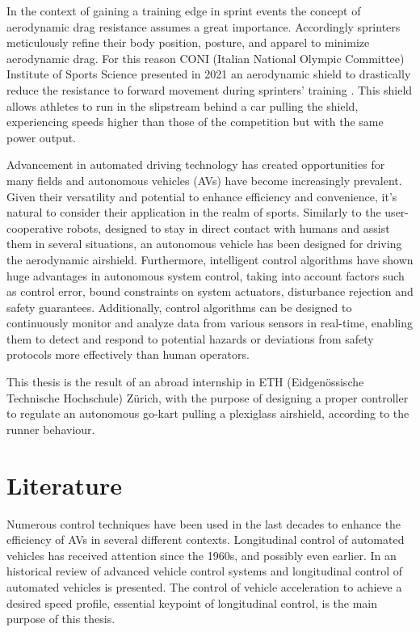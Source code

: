 \documentclass[a4paper,12pt,oneside]{book}
\begin{document}
In the context of gaining a training edge in sprint events the concept of aerodynamic drag resistance assumes a great importance. 
Accordingly sprinters meticulously refine their body position, posture, and apparel to minimize aerodynamic drag. 
For this reason CONI (Italian National Olympic Committee) Institute of Sports Science presented in 2021 an aerodynamic shield to drastically reduce the resistance to forward movement during sprinters' training \cite{Coni_article}. 
This shield allows athletes to run in the slipstream behind a car pulling the shield, experiencing speeds higher than those of the competition but with the same power output. 
\bigskip

Advancement in automated driving technology has created opportunities for many fields and autonomous vehicles (AVs) have become increasingly prevalent. 
Given their versatility and potential to enhance efficiency and convenience, it's natural to consider their application in the realm of sports. 
Similarly to the user-cooperative robots, designed to stay in direct contact with humans and assist them in several situations, an autonomous vehicle has been designed for driving the aerodynamic airshield. 
Furthermore, intelligent control algorithms have shown huge advantages in autonomous system control, taking into account factors such as control error, bound constraints on system actuators, disturbance rejection and safety guarantees. Additionally, control algorithms can be designed to continuously monitor and analyze data from various sensors in real-time, enabling them to detect and respond to potential hazards or deviations from safety protocols more effectively than human operators.
\bigskip

This thesis is the result of an abroad internship in ETH (Eidgen\"ossische Technische Hochschule) Z\"urich, with the purpose of designing a proper controller to regulate an autonomous go-kart pulling a plexiglass airshield, according to the runner behaviour.

		
\section*{Literature}
Numerous control techniques have been used in the last decades to enhance the efficiency of AVs in several different contexts.
Longitudinal control of automated vehicles has received attention since the 1960s, and possibly even earlier.
In \cite{Review_AVCS} an historical review of advanced vehicle control systems and longitudinal control of automated vehicles is presented.
The control of vehicle acceleration to achieve a desired speed profile, essential keypoint of longitudinal control, is the main purpose of this thesis.
\end{document}
